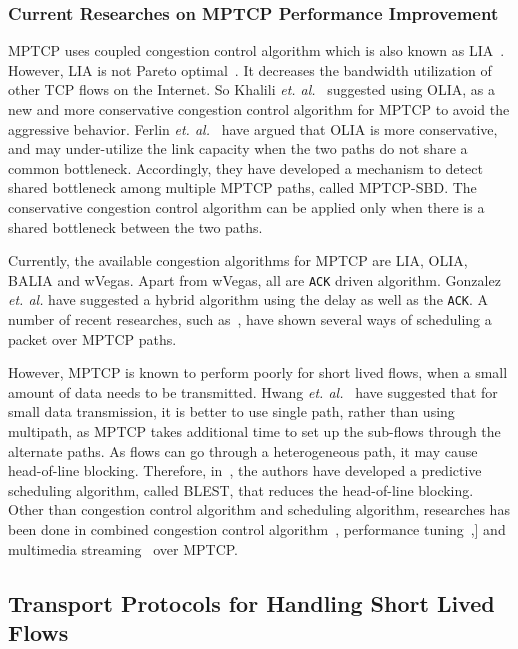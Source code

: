 \subsubsection{Current Researches on MPTCP Performance Improvement}

MPTCP uses coupled congestion control algorithm which is also known as LIA~\cite{LIARFC6356}. However, LIA is not Pareto optimal~\cite{OLIARamin2012}. It decreases the bandwidth utilization of other TCP flows on the Internet. So Khalili \textit{et. al.}~\cite{OLIARamin2012} suggested using OLIA, as a new and more conservative congestion control algorithm for MPTCP to avoid the aggressive behavior. Ferlin \textit{et. al.}~\cite{MPTCP-SBD} have argued that OLIA is more conservative, and may under-utilize the link capacity when the two paths do not share a common bottleneck. Accordingly, they have developed a mechanism to detect shared bottleneck among multiple MPTCP paths, called MPTCP-SBD. The conservative congestion control algorithm can be applied only when there is a shared bottleneck between the two paths. 

Currently, the available congestion algorithms for MPTCP are LIA, OLIA, BALIA and wVegas\cite{wVegas}. Apart from wVegas, all are \texttt{ACK} driven algorithm. Gonzalez \textit{et. al.}\cite{Balia-wvegas} have suggested a hybrid algorithm using the delay as well as the \texttt{ACK}. A number of recent researches, such as~\cite{aschedulermptcp,blestschedular,scheadulerformptcp}, have shown several ways of scheduling a packet over MPTCP paths. 

However, MPTCP is known to perform poorly for short lived flows, when a small amount of data needs to be transmitted. Hwang \textit{et. al.}~\cite{scheadulerformptcp} have suggested that for small data transmission, it is better to use single path, rather than using multipath, as MPTCP takes additional time to set up the sub-flows through the alternate paths. As flows can go through a heterogeneous path, it may cause head-of-line blocking. Therefore, in~\cite{blestschedular}, the authors have developed a predictive scheduling algorithm, called BLEST, that reduces the head-of-line blocking. Other than congestion control algorithm and scheduling algorithm, researches has been done in combined congestion control algorithm~\cite{outofordermptcp}, performance tuning~\cite{optimization},] and multimedia streaming~\cite{streaming} over MPTCP.


\subsection{Transport Protocols for Handling Short Lived Flows}

